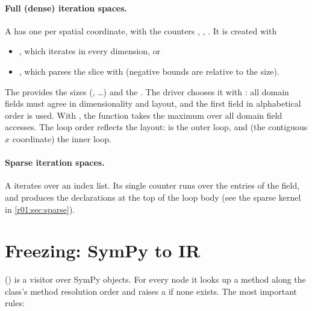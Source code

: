 \paragraph{Full (dense) iteration spaces.}
A  has one  per
spatial coordinate, with the counters , , . It is
created with
\begin{itemize}
  \item {}, which
        iterates \code{[gl_low, size - gl_high)} in every dimension, or
  \item {}, which parses
        the slice with  (negative bounds are relative to the
        size).
\end{itemize}
The  provides the sizes (, \dots) and the
. The driver chooses it with : all domain
fields must agree in dimensionality and layout, and the first field in alphabetical
order is used. With , the function 
takes the maximum  over all domain field accesses.
The loop order  reflects the  layout:  is the outer
loop, and  (the contiguous $x$ coordinate) the inner loop.

\paragraph{Sparse iteration spaces.}
A  iterates over an index list. Its single counter
 runs over the entries of the  field, and
 produces the declarations
 at the top of the loop body (see the sparse
kernel in \cref{r01:sec:sparse}).

\section{Freezing: SymPy to IR}\label{r01:sec:freeze}

 () is a visitor over SymPy objects. For every
node it looks up a method  along the class's method resolution
order and raises a  if none exists. The most important rules:

